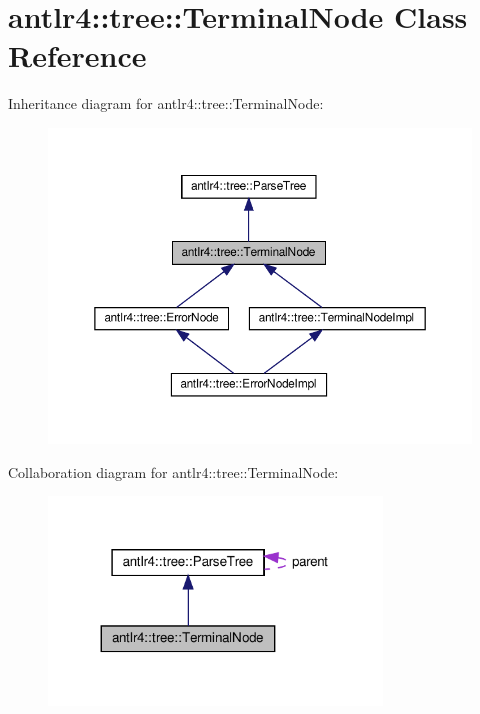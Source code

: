 \hypertarget{classantlr4_1_1tree_1_1TerminalNode}{}\section{antlr4\+:\+:tree\+:\+:Terminal\+Node Class Reference}
\label{classantlr4_1_1tree_1_1TerminalNode}


Inheritance diagram for antlr4\+:\+:tree\+:\+:Terminal\+Node\+:
\nopagebreak
\begin{figure}[H]
\begin{center}
\leavevmode
\includegraphics[width=350pt]{classantlr4_1_1tree_1_1TerminalNode__inherit__graph}
\end{center}
\end{figure}


Collaboration diagram for antlr4\+:\+:tree\+:\+:Terminal\+Node\+:
\nopagebreak
\begin{figure}[H]
\begin{center}
\leavevmode
\includegraphics[width=251pt]{classantlr4_1_1tree_1_1TerminalNode__coll__graph}
\end{center}
\end{figure}
